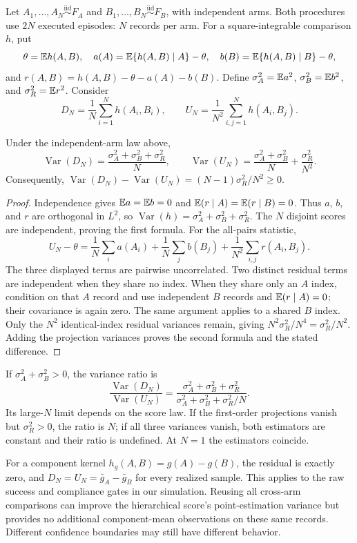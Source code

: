 Let $A_1,\ldots,A_N\overset{\mathrm{iid}}\sim F_A$ and
$B_1,\ldots,B_N\overset{\mathrm{iid}}\sim F_B$, with independent arms.
Both procedures use $2N$ executed episodes: $N$ records per arm.
For a square-integrable comparison $h$, put
\[
 \theta=\mathbb E h(A,B),\quad
 a(A)=\mathbb E\{h(A,B)\mid A\}-\theta,\quad
 b(B)=\mathbb E\{h(A,B)\mid B\}-\theta,
\]
and $r(A,B)=h(A,B)-\theta-a(A)-b(B)$. Define
$\sigma_A^2=\mathbb E a^2$, $\sigma_B^2=\mathbb E b^2$, and
$\sigma_R^2=\mathbb E r^2$. Consider
\[
 D_N=\frac1N\sum_{i=1}^N h(A_i,B_i),\qquad
 U_N=\frac1{N^2}\sum_{i,j=1}^N h(A_i,B_j).
\]
\begin{proposition}
Under the independent-arm law above,
\[
 \operatorname{Var}(D_N)
   =\frac{\sigma_A^2+\sigma_B^2+\sigma_R^2}{N},\qquad
 \operatorname{Var}(U_N)
   =\frac{\sigma_A^2+\sigma_B^2}{N}+\frac{\sigma_R^2}{N^2}.
\]
Consequently, $\operatorname{Var}(D_N)-\operatorname{Var}(U_N)
=(N-1)\sigma_R^2/N^2\geq0$.
\end{proposition}
\begin{proof}
Independence gives $\mathbb E a=\mathbb E b=0$ and
$\mathbb E(r\mid A)=\mathbb E(r\mid B)=0$. Thus $a$, $b$, and $r$ are orthogonal
in $L^2$, so $\operatorname{Var}(h)=\sigma_A^2+\sigma_B^2+\sigma_R^2$.
The $N$ disjoint scores are independent, proving the first formula.
For the all-pairs statistic,
\[
 U_N-\theta=\frac1N\sum_i a(A_i)+\frac1N\sum_j b(B_j)
                    +\frac1{N^2}\sum_{i,j}r(A_i,B_j).
\]
The three displayed terms are pairwise uncorrelated. Two distinct
residual terms are independent when they share no index. When they
share only an $A$ index, condition on that $A$ record and use independent
$B$ records and $\mathbb E(r\mid A)=0$; their covariance is again zero.
The same argument applies to a shared $B$ index. Only the $N^2$
identical-index residual variances remain, giving
$N^2\sigma_R^2/N^4=\sigma_R^2/N^2$. Adding the projection variances
proves the second formula and the stated difference.
\end{proof}

If $\sigma_A^2+\sigma_B^2>0$, the variance ratio is
\[
 \frac{\operatorname{Var}(D_N)}{\operatorname{Var}(U_N)}
 =\frac{\sigma_A^2+\sigma_B^2+\sigma_R^2}
        {\sigma_A^2+\sigma_B^2+\sigma_R^2/N}.
\]
Its large-$N$ limit depends on the score law. If the first-order
projections vanish but $\sigma_R^2>0$, the ratio is $N$; if all three
variances vanish, both estimators are constant and their ratio is
undefined. At $N=1$ the estimators coincide.

For a component kernel $h_g(A,B)=g(A)-g(B)$, the residual is exactly
zero, and $D_N=U_N=\bar g_A-\bar g_B$ for every realized sample.
This applies to the raw success and compliance gates in our simulation.
Reusing all cross-arm comparisons can improve the hierarchical score's
point-estimation variance but provides no additional component-mean
observations on these same records. Different confidence boundaries may
still have different behavior.

